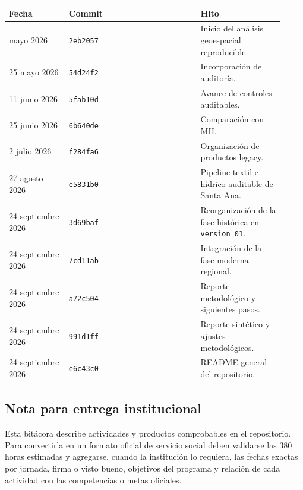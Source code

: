 \documentclass[
  spanish,
]{article}
\newcounter{none} %
\begin{document}
{\def\LTcaptype{none} %
\begin{longtable}[]{@{}p{0.20\linewidth}p{0.44\linewidth}p{0.28\linewidth}@{}}
\toprule\noalign{}
Fecha & Commit & Hito \\
\midrule\noalign{}
\endhead
\bottomrule\noalign{}
\endlastfoot
25 mayo 2026 & \texttt{2eb2057} & Inicio del análisis geoespacial
reproducible. \\
25 mayo 2026 & \texttt{54d24f2} & Incorporación de auditoría. \\
11 junio 2026 & \texttt{5fab10d} & Avance de controles auditables. \\
25 junio 2026 & \texttt{6b640de} & Comparación con MH. \\
2 julio 2026 & \texttt{f284fa6} & Organización de productos legacy. \\
27 agosto 2026 & \texttt{e5831b0} & Pipeline textil e hídrico auditable
de Santa Ana. \\
24 septiembre 2026 & \texttt{3d69baf} & Reorganización de la fase
histórica en \texttt{version\_01}. \\
24 septiembre 2026 & \texttt{7cd11ab} & Integración de la fase moderna
regional. \\
24 septiembre 2026 & \texttt{a72c504} & Reporte metodológico y
siguientes pasos. \\
24 septiembre 2026 & \texttt{991d1ff} & Reporte sintético y ajustes
metodológicos. \\
24 septiembre 2026 & \texttt{e6c43c0} & README general del
repositorio. \\
\end{longtable}
}

\subsection{Nota para entrega
institucional}\label{nota-para-entrega-institucional}

Esta bitácora describe actividades y productos comprobables en el
repositorio. Para convertirla en un formato oficial de servicio social
deben validarse las 380 horas estimadas y agregarse, cuando la institución
lo requiera, las fechas exactas por jornada, firma o visto bueno,
objetivos del programa y relación de cada actividad con las competencias
o metas oficiales.
\end{document}
